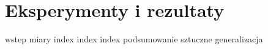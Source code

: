 \chapter{Eksperymenty i rezultaty}

{wstep}
{miary}
{index}
{index}
\newpage
{index}
\newpage
{podsumowanie}
{sztuczne}
{generalizacja}
